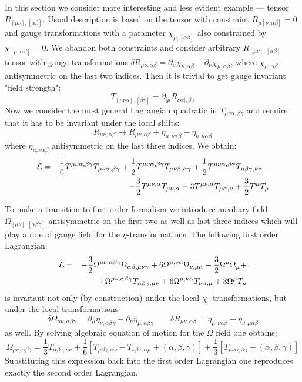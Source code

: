 \documentclass[a4paper,12pt]{article}
\begin{document}
In this section we consider more interesting and less evident example
--- tensor $R_{[\mu\nu],[\alpha\beta]}$. Usual description is based on
the tensor with constraint $R_{\mu[\nu,\alpha\beta]} = 0$ and gauge
transformations with a parameter $\chi_{\mu,[\alpha\beta]}$ also
constrained by $\chi_{[\mu,\alpha\beta]} = 0$. We abandon both
constraints and consider arbitrary $R_{[\mu\nu],[\alpha\beta]}$ tensor
with gauge transformations
$\delta R_{\mu\nu,\alpha\beta} = \partial_\mu \chi_{\nu,\alpha\beta}
- \partial_\nu \chi_{\mu,\alpha\beta} $, where
$\chi_{\mu,\alpha\beta}$ antisymmetric on the last two indices. Then
it is trivial to get gauge invariant "field strength":
$$
T_{[\mu\nu\alpha],[\beta\gamma]} = \partial_{[\mu}
R_{\nu\alpha],\beta\gamma}
$$
Now we consider the most general Lagrangian quadratic in
$T_{\mu\nu\alpha,\beta\gamma}$ and require that it has to be invariant
under the local shifts:
$$
R_{\mu\nu,\alpha\beta} \rightarrow R_{\mu\nu,\alpha\beta} +
\eta_{\mu,\nu\alpha\beta} - \eta_{\nu,\mu\alpha\beta}
$$
where $\eta_{\mu,\nu\alpha\beta}$ antisymmetric on the last three
indices. We obtain:
\begin{eqnarray}
{\cal L} &=& \frac{1}{6} T^{\mu\nu\alpha,\beta\gamma}
T_{\mu\nu\alpha,\beta\gamma} + \frac{1}{2}
T^{\mu\nu\alpha,\beta\gamma} T_{\mu\nu\beta,\alpha\gamma} +
\frac{1}{2} T^{\mu\nu\alpha,\beta\gamma} T_{\mu\beta\gamma,\nu\alpha}
- \nonumber \\
 && - \frac{3}{2} T^{\mu\nu,\alpha} T_{\mu\nu,\alpha} - 3
 T^{\mu\nu,\alpha} T_{\mu\alpha,\nu} + \frac{3}{2} T^\mu T_\mu
\end{eqnarray}

To make a transition to first order formalism we introduce auxiliary
field $\Omega_{[\mu\nu],[\alpha\beta\gamma]}$ antisymmetric on the
first two as well as last three indices which will play a role of
gauge
field for the $\eta$-transformations. The following first order
Lagrangian:
\begin{eqnarray}
{\cal L} &=& - \frac{3}{2} \Omega^{\mu\nu,\alpha\beta\gamma}
\Omega_{\alpha\beta,\mu\nu\gamma} + 6 \Omega^{\mu,\nu\alpha}
\Omega_{\nu,\mu\alpha} - \frac{3}{2} \Omega^\mu \Omega_\mu + \nonumber
\\
 && + \Omega^{\mu\nu,\alpha\beta\gamma} T_{\alpha\beta\gamma,\mu\nu}
 + 6 \Omega^{\mu,\nu\alpha} T_{\nu\alpha,\mu} + 3 \Omega^\mu T_\mu
\end{eqnarray}
is invariant not only (by construction) under the local $\chi$-
transformations, but under the local transformations
$$
\delta \Omega_{\mu\nu,\alpha\beta\gamma} = \partial_\mu
\eta_{\nu,\alpha\beta\gamma} - \partial_\nu
\eta_{\mu,\alpha\beta\gamma} \qquad
\delta R_{\mu\nu,\alpha\beta} =
\eta_{\mu,\nu\alpha\beta} - \eta_{\nu,\mu\alpha\beta}
$$
as well. By solving algebraic equation of motion for the $\Omega$
field one obtains:
\begin{equation}
\Omega_{\mu\nu,\alpha\beta\gamma} = \frac{1}{3}
T_{\alpha\beta\gamma,\mu\nu} + \frac{1}{6} [ T_{\mu\beta\gamma,\alpha
\nu} - T_{\nu\beta\gamma,\alpha\mu} + (\alpha,\beta,\gamma)] +
\frac{1}{3} [ T_{\mu\nu\alpha,\beta\gamma} + (\alpha,\beta,\gamma) ]
\end{equation}
Substituting this expression back into the first order Lagrangian one
reproduces exactly the second order Lagrangian.
\end{document}
